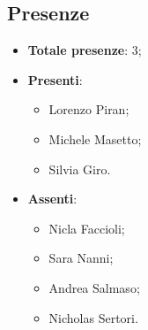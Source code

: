 \documentclass[11pt]{article}
\begin{document}
	\subsection{Presenze}
	\begin{itemize}
		\item \textbf{Totale presenze}: 3;
		\item \textbf{Presenti}:
		\begin{itemize}
			\item Lorenzo Piran;
			\item Michele Masetto;
			\item Silvia Giro.
		\end{itemize}
		\item \textbf{Assenti}:
		\begin{itemize}
			\item Nicla Faccioli;
			\item Sara Nanni;
			\item Andrea Salmaso;
			\item Nicholas Sertori.
		\end{itemize}
	\end{itemize}

	\newpage
\end{document}
